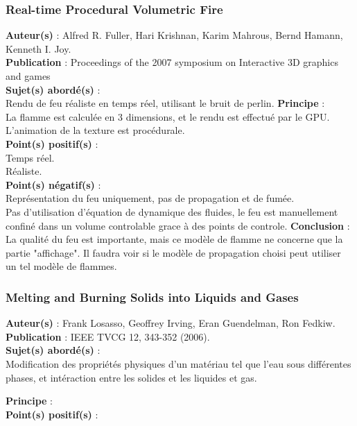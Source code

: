 \documentclass[a4paper,10pt]{article}
\begin{document}
\subsubsection{Real-time Procedural Volumetric Fire}
\textbf{Auteur(s)} : Alfred R. Fuller, Hari Krishnan, Karim Mahrous, Bernd Hamann, Kenneth I. Joy.\\
\textbf{Publication} : Proceedings of the 2007 symposium on Interactive 3D graphics and games\\
\textbf{Sujet(s) abordé(s)} : \\
	Rendu de feu réaliste en temps réel, utilisant le bruit de perlin.
\textbf{Principe} :\\
	La flamme est calculée en 3 dimensions, et le rendu est effectué par le GPU.\\
	L'animation de la texture est procédurale.\\	
\textbf{Point(s) positif(s)} :\\
	Temps réel.\\
	Réaliste.\\
\textbf{Point(s) négatif(s)} :\\
	Représentation du feu uniquement, pas de propagation et de fumée.\\
	Pas d'utilisation d'équation de dynamique des fluides, le feu est manuellement confiné dans un volume controlable grace à des points de controle.
\textbf{Conclusion} :\\
	La qualité du feu est importante, mais ce modèle de flamme ne concerne que la partie "affichage". Il faudra voir si le modèle de propagation choisi peut utiliser un tel modèle de flammes.


\subsubsection{Melting and Burning Solids into Liquids and Gases}
\textbf{Auteur(s)} : Frank Losasso, Geoffrey Irving, Eran Guendelman, Ron Fedkiw.\\
\textbf{Publication} : IEEE TVCG 12, 343-352 (2006).\\
\textbf{Sujet(s) abordé(s)} : \\
	Modification des propriétés physiques d'un matériau tel que l'eau sous différentes phases, et intéraction entre les solides et les liquides et gas. 

\textbf{Principe} :\\	

\textbf{Point(s) positif(s)} :\\
\end{document}
